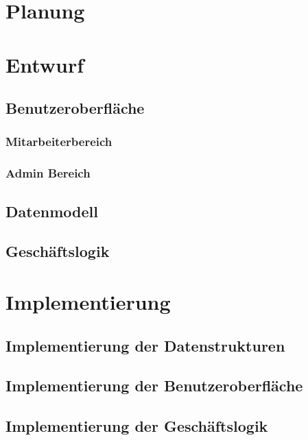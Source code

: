\documentclass{article}
\begin{document}
\section{Planung}

\section{Entwurf}

\subsection{Benutzeroberfläche}

\subsubsection{Mitarbeiterbereich}

\subsubsection{Admin Bereich}

\subsection{Datenmodell}

\subsection{Geschäftslogik}

\section{Implementierung}
\subsection{Implementierung der Datenstrukturen}
\subsection{Implementierung der Benutzeroberfläche}
\subsection{Implementierung der Geschäftslogik}
\end{document}

